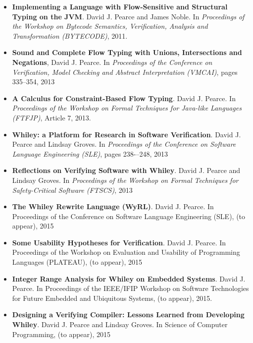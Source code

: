 \begin{itemize}
\item {\bf Implementing a Language with Flow-Sensitive and Structural Typing on the JVM}.  David J. Pearce and James Noble. In {\em Proceedings of the Workshop on Bytecode Semantics, Verification, Analysis and Transformation (BYTECODE)}, 2011. 

\item {\bf Sound and Complete Flow Typing with Unions, Intersections and Negations}, David J. Pearce.  In {\em Proceedings of the Conference on Verification, Model Checking and Abstract Interpretation (VMCAI)}, pages 335--354, 2013

\item {\bf A Calculus for Constraint-Based Flow Typing}. David J. Pearce. In {\em Proceedings of the Workshop on Formal Techniques for Java-like Languages (FTFJP)}, Article 7, 2013.

\item {\bf Whiley: a Platform for Research in Software Verification}. David J. Pearce and Lindsay Groves. In {\em Proceedings of the Conference on Software Language Engineering (SLE)}, pages 238-–248, 2013

\item {\bf Reflections on Verifying Software with Whiley}. David J. Pearce and Lindsay Groves. In {\em Proceedings of the Workshop on Formal Techniques for Safety-Critical Software (FTSCS)}, 2013

\item {\bf The Whiley Rewrite Language (WyRL)}. David J. Pearce. In Proceedings of the Conference on Software Language Engineering (SLE), (to appear), 2015

\item {\bf Some Usability Hypotheses for Verification}. David J. Pearce. In Proceedings of the Workshop on Evaluation and Usability of Programming Languages (PLATEAU), (to appear), 2015

\item {\bf Integer Range Analysis for Whiley on Embedded Systems}. David J. Pearce. In Proceedings of the IEEE/IFIP Workshop on Software Technologies for Future Embedded and Ubiquitous Systems, (to appear), 2015.

\item {\bf Designing a Verifying Compiler: Lessons Learned from Developing Whiley}. David J. Pearce and Lindsay Groves. In Science of Computer Programming, (to appear), 2015

\end{itemize}